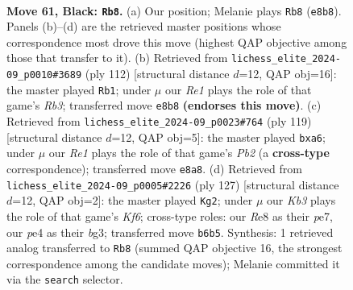 \documentclass[11pt]{article}
\begin{document}
\clearpage

\begin{figure}[p]\centering
\begin{subfigure}{0.46\textwidth}\centering
\resizebox{\linewidth}{!}{%
\newchessgame
\chessboard[
  setfen={4r3/6Q1/1k6/6P1/4P2P/8/1K6/8 b - - 8 61},
  showmover=false,
  pgfstyle=straightmove, color=movearrow, markmove={e8-b8}
]}
\caption{}
\end{subfigure}\hfill
\begin{subfigure}{0.46\textwidth}\centering
\resizebox{\linewidth}{!}{%
\newchessgame
\chessboard[
  setfen={8/6k1/8/4q2p/8/1R4p1/6P1/6K1 w - - 0 57},
  showmover=false,
  pgfstyle=straightmove, color=movearrow, markmove={b3-b1}
]}
\caption{}
\end{subfigure}
\\[4pt]
\begin{subfigure}{0.46\textwidth}\centering
\resizebox{\linewidth}{!}{%
\newchessgame
\chessboard[
  setfen={8/1p6/P7/7K/k1P5/3P4/3Q4/8 b - - 0 60},
  showmover=false,
  pgfstyle=straightmove, color=movearrow, markmove={b7-a6}
]}
\caption{}
\end{subfigure}\hfill
\begin{subfigure}{0.46\textwidth}\centering
\resizebox{\linewidth}{!}{%
\newchessgame
\chessboard[
  setfen={3Q4/4P3/p7/8/P2K4/5kB1/8/8 b - - 0 64},
  showmover=false,
  pgfstyle=straightmove, color=movearrow, markmove={f3-g2}
]}
\caption{}
\end{subfigure}
\caption{\textbf{Move 61, Black: \texttt{Rb8}.} (a) Our position; Melanie plays \texttt{Rb8} (\texttt{e8b8}). Panels (b)--(d) are the retrieved master positions whose correspondence most drove this move (highest QAP objective among those that transfer to it). (b) Retrieved from \texttt{lichess\_elite\_2024-09\_p0010\#3689} (ply 112) [structural distance $d$=12, QAP obj=16]: the master played \texttt{Rb1}; under $\mu$ our \emph{Re1} plays the role of that game's \emph{Rb3}; transferred move \texttt{e8b8} \textbf{(endorses this move)}. (c) Retrieved from \texttt{lichess\_elite\_2024-09\_p0023\#764} (ply 119) [structural distance $d$=12, QAP obj=5]: the master played \texttt{bxa6}; under $\mu$ our \emph{Re1} plays the role of that game's \emph{Pb2} (a \textbf{cross-type} correspondence); transferred move \texttt{e8a8}. (d) Retrieved from \texttt{lichess\_elite\_2024-09\_p0005\#2226} (ply 127) [structural distance $d$=12, QAP obj=2]: the master played \texttt{Kg2}; under $\mu$ our \emph{Kb3} plays the role of that game's \emph{Kf6}; cross-type roles: our \emph{R}e8 as their \emph{p}e7, our \emph{p}e4 as their \emph{b}g3; transferred move \texttt{b6b5}. Synthesis: 1 retrieved analog transferred to \texttt{Rb8} (summed QAP objective 16, the strongest correspondence among the candidate moves); Melanie committed it via the \texttt{search} selector.}
\label{fig:thought-m121}
\end{figure}
\end{document}
